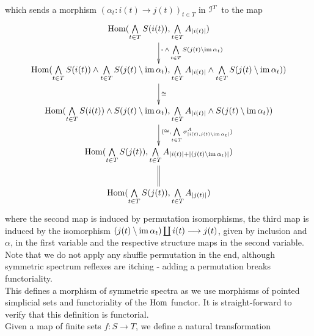 \begin{defn}
\begin{gather*}
      \end{gather*}
      which sends a morphism $(\alpha_t \colon i(t) \to j(t))_{t \in T}$ in $\mathcal{I}^T$ to the map
      \begin{displaymath}
        \xymatrix{
          \Hom(\bigwedge\limits_{t \in T} S(i(t)), \bigwedge\limits_{t \in T} A_{\abs{i(t)}})
            \ar[d]^-{ \operatorname{-} \wedge \bigwedge\limits_{t \in T} S(j(t) \setminus \im \alpha_t) } \\
          \Hom(\bigwedge\limits_{t \in T} S(i(t)) \wedge %
            \bigwedge\limits_{t \in T} S(j(t) \setminus \im \alpha_t), %
            \bigwedge\limits_{t \in T} A_{\abs{i(t)}} \wedge %
            \bigwedge\limits_{t \in T} S(j(t) \setminus \im \alpha_t))
            \ar[d]^-{\cong} \\
          \Hom(\bigwedge\limits_{t \in T} S(i(t)) \wedge S(j(t) \setminus \im \alpha_t), %
            \bigwedge\limits_{t \in T} A_{\abs{i(t)}} \wedge S(j(t) \setminus \im \alpha_t)) 
            \ar[d]^-{(\cong, \bigwedge\limits_{t \in T} \sigma^A_{\abs{i(t),j(t)\setminus\im\alpha_t}})} \\
          \Hom(\bigwedge\limits_{t \in T} S(j(t)), \bigwedge\limits_{t \in T} A_{\abs{i(t)} + \abs{(j(t)\setminus \im \alpha_t)}})
            \ar@{=}[d] \\
          \Hom(\bigwedge\limits_{t \in T} S(j(t)), \bigwedge\limits_{t \in T} A_{\abs{j(t)}})
        }
      \end{displaymath}
      where the second map is induced by permutation isomorphisms, the third map is induced by the isomorphism $(j(t) \setminus \operatorname{im} \alpha_t) \coprod i(t) \longrightarrow j(t)$, given by inclusion and $\alpha$, in the first variable and the respective structure maps in the second variable. Note that we do not apply any shuffle permutation in the end, although symmetric spectrum reflexes are itching - adding a permutation breaks functoriality.\\
      This defines a morphism of symmetric spectra as we use morphisms of pointed simplicial sets and functoriality of the $\operatorname{Hom}$ functor. It is straight-forward to verify that this definition is functorial.\\
      Given a map of finite sets $f \colon S \to T$, we define a natural transformation
      \begin{displaymath}

\end{displaymath}
\end{defn}
